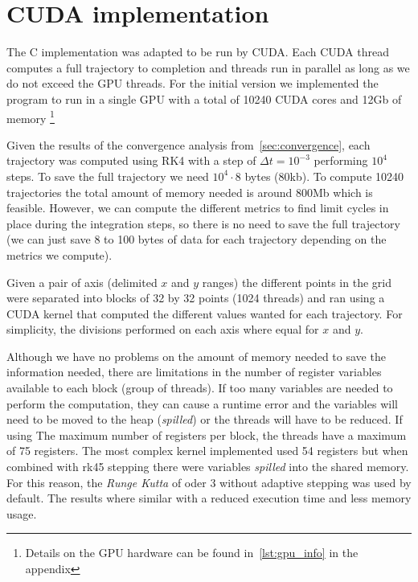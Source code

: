
\section{CUDA implementation}

The C implementation was adapted to be run by CUDA. Each CUDA thread computes a full trajectory to completion and threads run in parallel as long as we do not
exceed the GPU threads. For the initial version we implemented the program to run in a single GPU with a total of 10240 CUDA cores and 12Gb of memory
\footnote{Details on the GPU hardware can be found in~\cref{lst:gpu_info} in the appendix}

Given the results of the convergence analysis from~\cref{sec:convergence}, each
trajectory was computed using RK4 with a step of $\Delta t=10^{-3}$ performing
$10^4$ steps. To save the full trajectory we need $10^4\cdot 8$ bytes (80kb). To
compute 10240 trajectories the total amount of memory needed is around 800Mb
which is feasible. However, we can compute the different metrics to find limit
cycles in place during the integration steps, so there is no need to save the
full trajectory (we can just save 8 to 100 bytes of data for each trajectory
depending on the metrics we compute).

Given a pair of axis (delimited $x$ and $y$ ranges) the different points in the
grid were separated into blocks of 32 by 32 points (1024 threads) and ran using
a CUDA kernel that computed the different values wanted for each trajectory. For
simplicity, the divisions performed on each axis where equal
for $x$ and $y$.

Although we have no problems on the amount of memory needed to save the
information needed, there are limitations in the number of register variables
available to each block (group of threads). If too many variables are needed to
perform the computation, they can cause a runtime error and the variables will
need to be moved to the heap (\emph{spilled}) or the threads will have to be
reduced. If using The maximum number of registers per block, the threads have a
maximum of 75 registers. The most complex kernel implemented used 54 registers
but when combined with rk45 stepping there were variables \emph{spilled} into
the shared memory. For this reason, the \emph{Runge Kutta} of oder 3 without adaptive
stepping was used by default. The results where similar with a reduced execution time
and less memory usage.

